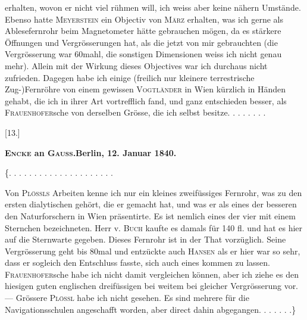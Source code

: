 \par{}
\clearpage{}
\noindent erhalten, wovon er nicht viel rühmen will, ich weiss aber keine nähern Umstände. Ebenso hatte \textsc{Meyerstein} ein Objectiv von \textsc{März} erhalten, was ich gerne als Ablesefernrohr beim Magnetometer hätte gebrauchen mögen, da es stärkere Öffnungen und Vergrösserungen hat, als die jetzt von mir gebrauchten (die Vergrösserung war 60mahl, die sonstigen Dimensionen weiss ich nicht genau mehr). Allein mit der Wirkung dieses Objectives war ich durchaus nicht zufrieden. Dagegen habe ich einige (freilich nur kleinere terrestrische Zug-)Fernröhre von einem gewissen \textsc{Vogtländer} in Wien kürzlich in Händen gehabt, die ich in ihrer Art vortrefflich fand, und ganz entschieden besser, als \textsc{Frauenhofer}sche von derselben Grösse, die ich selbst besitze. . . . . . . .
\bigskip\begin{center}
[13.]\par\medskip
\textbf{\textsc{Encke} an \textsc{Gauss}.\quad Berlin, 12. Januar 1840.}
\end{center}
\noindent\{. . . . . . . . . . . . . . . . . . . . .\par
\noindent\hspace*{\parindent}Von \textsc{Plössls} Arbeiten kenne ich nur ein kleines zweifüssiges Fernrohr, was zu den ersten dialytischen gehört, die er gemacht hat, und was er als eines der besseren den Naturforschern in Wien präsentirte. Es ist nemlich eines der vier mit einem Sternchen bezeichneten. Herr v. \textsc{Buch} kaufte es damals für 140 fl. und hat es hier auf die Sternwarte gegeben. Dieses Fernrohr ist in der That vorzüglich. Seine Vergrösserung geht bis 80mal und entzückte auch \textsc{Hansen} als er hier war so sehr, dass er sogleich den Entschluss fasste, sich auch eines kommen zu lassen. \textsc{Frauenhofer}sche habe ich nicht damit vergleichen können, aber ich ziehe es den hiesigen guten englischen dreifüssigen bei weitem bei gleicher Vergrösserung vor. --- Grössere \textsc{Plössl} habe ich nicht gesehen. Es sind mehrere für die Navigationsschulen angeschafft worden, aber direct dahin abgegangen. . . . . . .\}
\clearpage\endgroup

